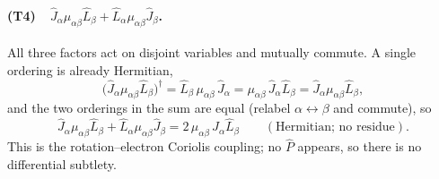 \paragraph{(T4)\ \ $\hat J_\alpha\mu_{\alpha\beta}\hat L_\beta+\hat L_\alpha\mu_{\alpha\beta}\hat J_\beta$.}
All three factors act on disjoint variables and mutually commute. A single ordering is already Hermitian,
\begin{equation}
\bigl(\hat J_\alpha\mu_{\alpha\beta}\hat L_\beta\bigr)^{\dagger}
=\hat L_\beta\,\mu_{\alpha\beta}\,\hat J_\alpha
=\mu_{\alpha\beta}\,\hat J_\alpha\hat L_\beta
=\hat J_\alpha\mu_{\alpha\beta}\hat L_\beta , \tag{B.11}
\end{equation}
and the two orderings in the sum are equal (relabel $\alpha\leftrightarrow\beta$ and commute), so
\begin{equation}
\hat J_\alpha\mu_{\alpha\beta}\hat L_\beta+\hat L_\alpha\mu_{\alpha\beta}\hat J_\beta
=2\,\mu_{\alpha\beta}\,\hat J_\alpha\hat L_\beta
\qquad(\text{Hermitian; no residue}). \tag{B.12}
\end{equation}
This is the rotation--electron Coriolis coupling; no $\hat P$ appears, so there is no differential subtlety.


